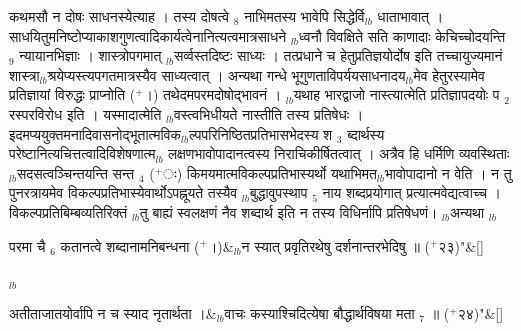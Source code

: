 \documentclass[article,12pt,a4paper]{memoir}%
\newcommand{\add}[1]{($^{+}$#1)}
\newcounter{parCount}
\begin{document}
	  
	  \pstart \leavevmode%
	\hphantom{.}कथमसौ न दोषः साधनस्येत्याह । {\color{DodgerBlue3}तस्य दोषत्वे} {\tiny $_{8}$} नाभिमतस्य भावेपि सिद्धेर्वि{\tiny $_{lb}$}\leavevmode{} धाताभावात् । साधयितुमनिष्टोप्याकाशगुणत्वादिकार्यत्वेनानित्यत्वमात्रसाधने {\tiny $_{lb}$}ध्वनौ विवक्षिते सति {\color{DodgerBlue3}काणादाः} केचिच्चोदयन्ति {\tiny $_{9}$} \leavevmode{} न्यायानभिज्ञाः । शास्त्रोपगमात् {\tiny $_{lb}$}सर्व्वस्तदिष्टः साध्यः । तत्प्रधाने च हेतुप्रतिज्ञयोर्दोष इति तच्चायुज्यमानं शास्त्रा{\tiny $_{lb}$}श्रयेप्यस्त्यपगतमात्रस्यैव साध्यत्वात् । अन्यथा गन्धे भूगुणताविपर्ययसाधनादय{\tiny $_{lb}$}मेव हेतुरस्यामेव प्रतिज्ञायां विरुद्धः प्राप्नोति \add{।} तथेदमपरमदोषोद्भावनं । {\tiny $_{lb}$}यथाह {\color{DodgerBlue3}भारद्वाजो नास्त्यात्मेति प्रतिज्ञापदयोः} प {\tiny $_{2}$} रस्परविरोध इति । यस्मादात्मेति {\tiny $_{lb}$}वस्त्वभिधीयते नास्तीति तस्य प्रतिषेधः । इदमप्ययुक्तमनादिवासनोद्भूतात्मविक{\tiny $_{lb}$}ल्पपरिनिष्ठितप्रतिभासभेदस्य श {\tiny $_{3}$} ब्दार्थस्य परेष्टानित्यचित्तत्वादिविशेषणात्म{\tiny $_{lb}$}\leavevmode{} लक्षणभावोपादानत्वस्य निराचिकीर्षितत्वात् । अत्रैव हि धर्मिणि व्यवस्थिताः {\tiny $_{lb}$}सदसत्वञ्चिन्तयन्ति सन्त {\tiny $_{4}$} \add{ः} किमयमात्मविकल्पप्रतिभास्यर्थो यथाभिमत{\tiny $_{lb}$}भावोपादानो न वेति । न तु पुनरत्रायमेव विकल्पप्रतिभास्येवार्थोऽपह्नूयते तस्यैव {\tiny $_{lb}$}बुद्धावुपस्थाप {\tiny $_{5}$} नाय शब्दप्रयोगात् प्रत्यात्मवेद्यत्वाच्च । विकल्पप्रतिबिम्बव्यतिरिक्तं {\tiny $_{lb}$}तु बाह्यं स्वलक्षणं नैव शब्दार्थ इति न तस्य विधिर्नापि प्रतिषेधणं। {\tiny $_{lb}$}अन्यथा
	{}
	\pend%
      {\tiny $_{lb}$}
	  \bigskip
	  \begingroup
	
	    
	    \stanza[\smallbreak]
	  परमा चै {\tiny $_{6}$} कतानत्वे शब्दानामनिबन्धना \add{।}&{\tiny $_{lb}$}न स्यात् प्रवृतिरथेषु दर्शनान्तरभेदिषु ॥ \add{२३}{\normalfontlatin\large\qquad{}"}\&[\smallbreak]
	  
	  
	  
	  \endgroup
	{\tiny $_{lb}$}
	  \bigskip
	  \begingroup
	
	    
	    \stanza[\smallbreak]
	  अतीताजातयोर्वापि न च स्याद नृतार्थता ।&{\tiny $_{lb}$}वाचः कस्याश्चिदित्येषा बौद्धार्थविषया मता {\tiny $_{7}$} ॥ \add{२४}{\normalfontlatin\large\qquad{}"}\&[\smallbreak]
	  
\end{document}
